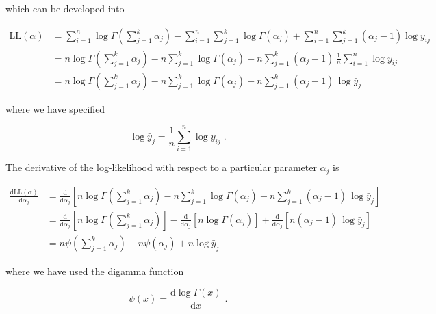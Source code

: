 \documentclass[a4paper,12pt,twoside]{book}
\begin{document}
which can be developed into

\begin{equation} \label{eq:dir-mle-Dir-LL-der}
\begin{split}
\mathrm{LL}(\alpha) &= \sum_{i=1}^n \log \Gamma\left( \sum_{j=1}^k \alpha_j \right) - \sum_{i=1}^n \sum_{j=1}^k \log \Gamma(\alpha_j) + \sum_{i=1}^n \sum_{j=1}^k (\alpha_j-1) \log y_{ij} \\
&= n \log \Gamma\left( \sum_{j=1}^k \alpha_j \right) - n \sum_{j=1}^k \log \Gamma(\alpha_j) + n \sum_{j=1}^k (\alpha_j-1) \, \frac{1}{n} \sum_{i=1}^n \log y_{ij} \\
&= n \log \Gamma\left( \sum_{j=1}^k \alpha_j \right) - n \sum_{j=1}^k \log \Gamma(\alpha_j) + n \sum_{j=1}^k (\alpha_j-1) \, \log \bar{y}_j
\end{split}
\end{equation}

where we have specified

\begin{equation} \label{eq:dir-mle-log-pi-reit}
\log \bar{y}_j = \frac{1}{n} \sum_{i=1}^n \log y_{ij} \; .
\end{equation}

The derivative of the log-likelihood with respect to a particular parameter $\alpha_j$ is

\begin{equation} \label{eq:dir-mle-Dir-dLLdaj}
\begin{split}
\frac{\mathrm{d}\mathrm{LL}(\alpha)}{\mathrm{d}\alpha_j} &= \frac{\mathrm{d}}{\mathrm{d}\alpha_j} \left[ n \log \Gamma\left( \sum_{j=1}^k \alpha_j \right) - n \sum_{j=1}^k \log \Gamma(\alpha_j) + n \sum_{j=1}^k (\alpha_j-1) \, \log \bar{y}_j \right] \\
&= \frac{\mathrm{d}}{\mathrm{d}\alpha_j} \left[ n \log \Gamma\left( \sum_{j=1}^k \alpha_j \right) \right] - \frac{\mathrm{d}}{\mathrm{d}\alpha_j} \left[ n \log \Gamma(\alpha_j) \right] + \frac{\mathrm{d}}{\mathrm{d}\alpha_j} \left[ n (\alpha_j-1) \, \log \bar{y}_j \right] \\
&= n \psi\left( \sum_{j=1}^k \alpha_j \right) - n \psi(\alpha_j) + n \log \bar{y}_j
\end{split}
\end{equation}

where we have used the digamma function

\begin{equation} \label{eq:dir-mle-digamma-fct}
\psi(x) = \frac{\mathrm{d}\log \Gamma(x)}{\mathrm{d}x} \; .
\end{equation}
\end{document}
